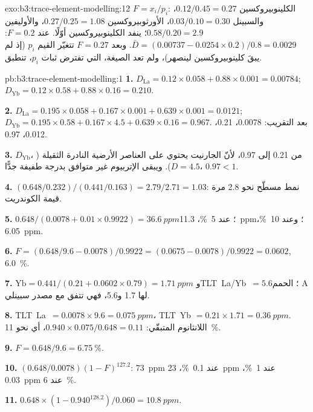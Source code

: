 \begin{solution}{exo:b3:trace-element-modelling:12}
$F = x_i/p_i$: الكلينوبيروكسين $0.12/0.45 = 0.27$، والسبينل $0.03/0.10 = 0.30$،
الأورثوبيروكسين $0.27/0.25 = 1.08$، والأوليفين $0.58/0.20 = 2.9$؛ ينفد الكلينوبيروكسين
أوّلًا. عند $F = 0.2$: $\bar D = (0.00737 - 0.0254\times0.2)/0.8 =
0.0029$. وبعد $F = 0.27$ تتغيّر القيم $p_i$ (إذ لم يبقَ كلينوبيروكسين لينصهر)،
ولم تعد الصيغة، التي تفترض ثبات $p_i$، تنطبق.
\end{solution}

\begin{solution}{pb:b3:trace-element-modelling:1}
\textbf{1.} $D_{\mathrm{La}} = 0.12\times0.058 + 0.88\times0.001 = 0.00784$;
$D_{\mathrm{Yb}} = 0.12\times0.58 + 0.88\times0.16 = 0.210$.

\textbf{2.} $D_{\mathrm{La}} = 0.195\times0.058 + 0.167\times0.001 +
0.639\times0.001 = 0.0121$; $D_{\mathrm{Yb}} = 0.195\times0.58 +
0.167\times4.5 + 0.639\times0.16 = 0.967$. بعد التقريب: 0.0078، 0.21، 0.012، 0.97.

\textbf{3.} $D_{\mathrm{Yb}}$، من 0.21 إلى 0.97، لأنّ الجارنيت يحتوي على
العناصر الأرضية النادرة الثقيلة ($D = 4.5$). ويبقى الإتربيوم غير متوافق بدرجة طفيفة جدًّا،
$0.97 < 1$.

\textbf{4.} $(0.648/0.232)/(0.441/0.163) = 2.79/2.71 = 1.03$: نمط مسطّح
نحو 2.8 مرة قيمة الكوندريت.

\textbf{5.} $0.648/(0.0078 + 0.01\times0.9922) = \qty{36.6}{ppm}$؛ عند
\qty{5}{\percent}، \qty{11.3}{ppm}؛ وعند \qty{10}{\percent}، \qty{6.05}{ppm}.

\textbf{6.} $F = (0.648/9.6 - 0.0078)/0.9922 = (0.0675 - 0.0078)/0.9922 =
0.0602$, \qty{6.0}{\percent}.

\textbf{7.} $\mathrm{Yb} = 0.441/(0.21 + 0.0602\times0.79) = \qty{1.71}{ppm}$
و\mbox{\textdir TLT La/Yb $= 5.6$}؛ الحمم A لها 1.7 و5.6، فهي تتفق مع مصدر سبينلي.

\textbf{8.} \mbox{\textdir TLT La $= 0.0078\times9.6 = \qty{0.075}{ppm}$}، \mbox{\textdir TLT Yb} $= 0.21\times1.71 =
\qty{0.36}{ppm}$. اللانثانوم المتبقّي: $0.940\times0.075/0.648 = 0.11$، أي نحو
\qty{11}{\percent}.

\textbf{9.} $F = 0.648/9.6 = \qty{6.75}{\percent}$.

\textbf{10.} $(0.648/0.0078)(1 - F)^{127.2}$: \qty{73}{ppm} عند
\qty{0.1}{\percent}، \qty{23}{ppm} عند \qty{1}{\percent}، \qty{0.03}{ppm} عند
\qty{6}{\percent}.

\textbf{11.} $0.648\times(1 - 0.940^{128.2})/0.060 = \qty{10.8}{ppm}$.


\end{solution}
